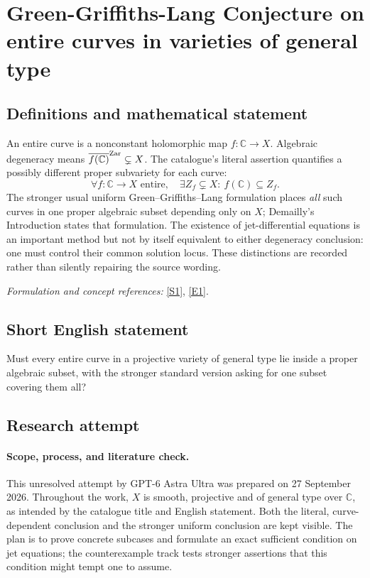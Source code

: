 \documentclass[11pt]{article}
\begin{document}
\section*{\texorpdfstring{Green-Griffiths-Lang Conjecture on entire curves in varieties of general type}{Green-Griffiths-Lang Conjecture on entire curves in varieties of general type}}\label{statement}
\subsection{Definitions and mathematical statement}
An entire curve is a nonconstant holomorphic map $f:{\mathbb{C}}\to X$. Algebraic degeneracy means $\overline{f({\mathbb{C}})}^{\rm Zar}\subsetneq X$. The catalogue's literal assertion quantifies a possibly different proper subvariety for each curve:
\[
 \forall f:{\mathbb{C}}\to X\text{ entire},\quad\exists Z_f\subsetneq X:\ f({\mathbb{C}})\subseteq Z_f.
\]
The stronger usual uniform Green--Griffiths--Lang formulation places \emph{all} such curves in one proper algebraic subset depending only on $X$; Demailly's Introduction states that formulation. The existence of jet-differential equations is an important method but not by itself equivalent to either degeneracy conclusion: one must control their common solution locus. These distinctions are recorded rather than silently repairing the source wording.
\par\smallskip\textit{Formulation and concept references:} \href{https://arxiv.org/abs/1011.3636}{[S1]}, \href{https://arxiv.org/html/1011.3636v2}{[E1]}.

\subsection{Short English statement}
Must every entire curve in a projective variety of general type lie inside a proper algebraic subset, with the stronger standard version asking for one subset covering them all?
\subsection{Research attempt}

\paragraph{Scope, process, and literature check.}
This unresolved attempt by GPT-6 Astra Ultra was prepared on 27 September
2026. Throughout the work, $X$ is smooth, projective and of general type
over $\mathbb C$, as intended by the catalogue title and English
statement. Both the literal, curve-dependent conclusion and the stronger
uniform conclusion are kept visible. The plan is to prove concrete
subcases and formulate an exact sufficient condition on jet equations;
the counterexample track tests stronger assertions that this condition
might tempt one to assume.
\end{document}
